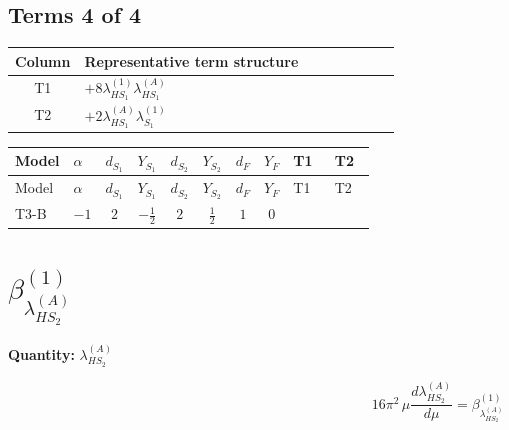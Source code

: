 \documentclass[8pt]{article}
\begin{document}
\begin{landscape}
\subsection*{Terms 4 of 4}
\begin{center}
\begin{tabular}{@{}c >{\raggedright\arraybackslash}p{0.82\linewidth}@{}}
\toprule
Column & Representative term structure \\
\midrule
T1 & \(\displaystyle +8 {\lambda_{HS_1}^{(1)}} {\lambda_{HS_1}^{(A)}}\) \\
\midrule
T2 & \(\displaystyle +2 {\lambda_{HS_1}^{(A)}} {\lambda_{S_1}^{(1)}}\) \\
\midrule
\bottomrule
\end{tabular}
\end{center}
\smallskip
\tiny
\begin{longtable}{@{}llcccccc >{\raggedright\arraybackslash}p{0.21\linewidth} >{\raggedright\arraybackslash}p{0.21\linewidth}@{}}
\toprule
Model & $\alpha$ & $d_{S_1}$ & $Y_{S_1}$ & $d_{S_2}$ & $Y_{S_2}$ & $d_F$ & $Y_F$ & T1 & T2 \\
\midrule
\endfirsthead
\toprule
Model & $\alpha$ & $d_{S_1}$ & $Y_{S_1}$ & $d_{S_2}$ & $Y_{S_2}$ & $d_F$ & $Y_F$ & T1 & T2 \\
\midrule
\endhead
T3-B & $-1$ & $2$ & $-\frac{1}{2}$ & $2$ & $\frac{1}{2}$ & $1$ & $0$ & \scriptsize\adjustbox{max width=\linewidth}{$\begin{gathered} +8 {\lambda_{HS_1}^{(1)}} {\lambda_{HS_1}^{(A)}}\end{gathered}$} & \scriptsize\adjustbox{max width=\linewidth}{$\begin{gathered} +2 {\lambda_{HS_1}^{(A)}} {\lambda_{S_1}^{(1)}}\end{gathered}$} \\
\midrule
\bottomrule
\end{longtable}
\clearpage
\section*{$\beta_{\lambda_{HS_2}^{(A)}}^{(1)}$}
\noindent\textbf{Quantity: }$\lambda_{HS_2}^{(A)}$\par\smallskip
\[16\pi^2\,\mu\frac{d \lambda_{HS_2}^{(A)}}{d\mu}=\beta_{\lambda_{HS_2}^{(A)}}^{(1)}\]

\end{landscape}
\end{document}
